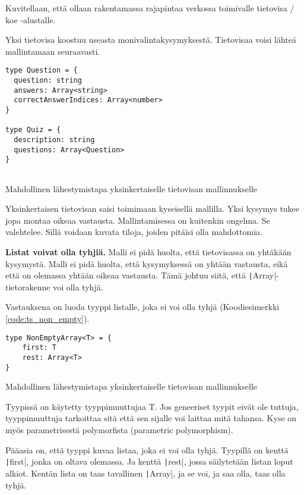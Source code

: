 Kuvitellaan, että ollaan rakentamassa rajapintaa verkossa toimivalle tietovisa / koe -alustalle.

Yksi tietovisa koostuu useasta monivalintakysymyksestä. Tietovisaa voisi lähteä mallintamaan seuraavasti.

\begin{code}
    \begin{verbatim}
type Question = {
  question: string
  answers: Array<string>
  correctAnswerIndices: Array<number>
}

type Quiz = {
  description: string
  questions: Array<Question>
}
         
\end{verbatim}
    \caption{Mahdollinen lähestymistapa yksinkertaiselle tietovisan mallinnukselle}
    \label{code:ts_first_quiz}
\end{code}

Yksinkertaisen tietovisan saisi toimimaan kyseisellä mallilla. Yksi kysymys tukee jopa montaa oikeaa vastausta.
Mallintamisessa on kuitenkin ongelma. Se valehtelee. Sillä voidaan kuvata tiloja, joiden pitäisi olla mahdottomia.

\textbf{Listat voivat olla tyhjiä.} Malli ei pidä huolta, että tietovisassa on yhtäkään kysymystä. Malli ei pidä huolta, että kysymyksessä on yhtään vastausta, eikä että on olemassa yhtään oikeaa vastausta. Tämä johtuu siitä, että \texttt|Array|-tietorakenne voi olla tyhjä.

Vastauksena on luoda tyyppi listalle, joka ei voi olla tyhjä (Koodiesimerkki \ref{code:ts_non_empty}).

\begin{code}
    \begin{verbatim}
type NonEmptyArray<T> = {
    first: T
    rest: Array<T>
}
    \end{verbatim}
    \caption{Mahdollinen lähestymistapa yksinkertaiselle tietovisan mallinnukselle}
    \label{code:ts_non_empty}
\end{code}

Tyypissä on käytetty tyyppimuuttujaa T. Jos geneeriset tyypit eivät ole tuttuja, tyyppimuuttuja tarkoittaa sitä että sen sijalle voi laittaa mitä tahansa. Kyse on myös parametrisestä polymorfista (parametric polymorphism).

Pääasia on, että tyyppi kuvaa listaa, joka ei voi olla tyhjä. Tyypillä on kenttä \texttt|first|, jonka on oltava olemassa. Ja kenttä \texttt|rest|, jossa säilytetään listan loput alkiot. Kentän lista on taas tavallinen \texttt|Array|, ja se voi, ja saa olla, taas olla tyhjä.


